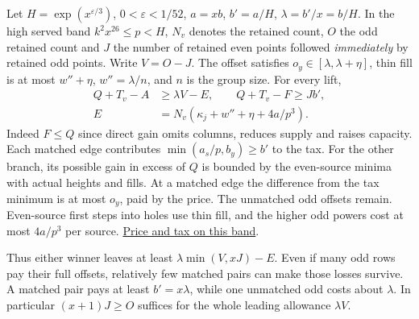 \documentclass[12pt,letterpaper]{article}
\newcommand{\orig}[3]{\href{https://github.com/nousentllc/riemann-hypothesis/blob/40e56bab026552e089d7afcfeff08d2defb9c005/src/#1.lean\#L#2}{#3}}
\begin{document}
Let \(H=\exp(x^{\varepsilon/3})\), \(0<\varepsilon<1/52\), \(a=xb\), \(b'=a/H\), \(\lambda=b'/x=b/H\). In the high served band \(k^2x^{26}\le p<H\), \(N_v\) denotes the retained count, \(O\) the odd retained count and \(J\) the number of retained even points followed \emph{immediately} by retained odd points. Write \(V=O-J\). The offset satisfies \(o_y\in[\lambda,\lambda+\eta]\), thin fill is at most \(w''+\eta\), \(w''=\lambda/n\), and \(n\) is the group size. For every lift,
\[
 \begin{split}
 Q+T_v-A &\ge\lambda V-E,\qquad
 Q+T_v-F \ge Jb',\\[-2pt]
 E&=N_v(\kappa_j+w''+\eta+4a/p^3).
 \end{split}
\]
Indeed \(F\le Q\) since direct gain omits columns, reduces supply and raises capacity. Each matched edge contributes \(\min(a_s/p,b_y)\ge b'\) to the tax. For the other branch, its possible gain in excess of \(Q\) is bounded by the even-source minima with actual heights and fills. At a matched edge the difference from the tax minimum is at most \(o_y\), paid by the price. The unmatched odd offsets remain. Even-source first steps into holes use thin fill, and the higher odd powers cost at most \(4a/p^3\) per source.
\orig{Formalism/SharpRestriction/GrowthBounds/LogarithmicSums/PartnerCountOfCentral}{769}{Price and tax on this band}.

Thus either winner leaves at least \(\lambda\min(V,xJ)-E\). Even if many odd rows pay their full offsets, relatively few matched pairs can make those losses survive. A matched pair pays at least \(b'=x\lambda\), while one unmatched odd costs about \(\lambda\). In particular \((x+1)J\ge O\) suffices for the whole leading allowance \(\lambda V\).
\end{document}

